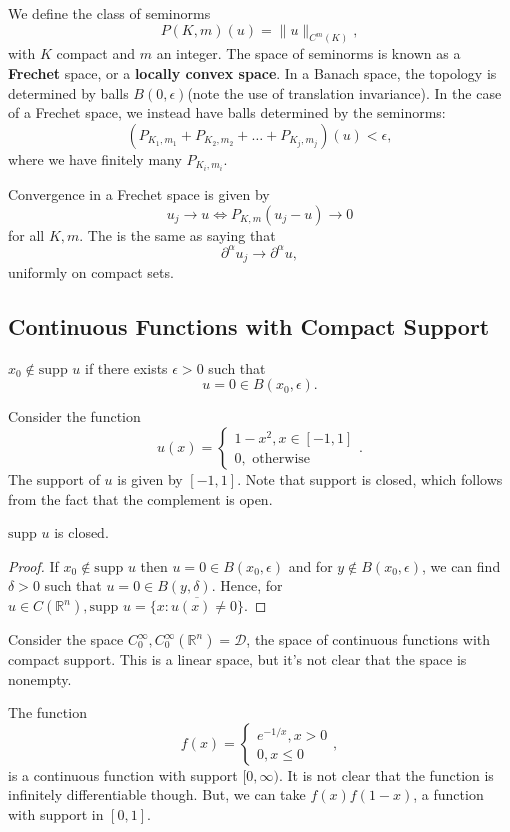 \documentclass[12pt]{scrartcl}
\newcommand{\R}{\mathbb{R}}
\newcommand{\supp}{\text{supp }}
\begin{document}
We define the class of seminorms $$P(K, m)(u) = \|u \|_{C^m(K)},$$
with $K$ compact and $m$ an integer.  The space of seminorms is known as a \textbf{Frechet }space, or a \textbf{locally convex space}.  In a Banach space, the topology is determined by balls $B(0, \epsilon)$(note the use of translation invariance). In the case of a Frechet space, we instead have balls determined by the seminorms:
$$\left (P_{K_1, m_1} + P_{K_2, m_2} + \dots + P_{K_j, m_j}\right )(u) < \epsilon,$$
where we have finitely many $P_{K_i, m_i}$.  

Convergence in a Frechet space is given by 
$$u_j \rightarrow u \Leftrightarrow P_{K, m}(u_j - u) \rightarrow 0$$
for all $K, m$.  The is the same as saying that 
$$\partial^\alpha u_j \rightarrow \partial^\alpha u,$$
uniformly on compact sets.

\subsection{Continuous Functions with Compact Support}
\begin{definition} $x_0 \not \in \text{supp }u$ if there exists $\epsilon > 0$ such that 
$$u = 0 \in B(x_0, \epsilon).$$
\end{definition}
\begin{example}
Consider the function $$u(x) = \begin{cases} 1-x^2, x \in [-1, 1] \\ 0, \text{ otherwise}
\end{cases}.$$
The support of $u$ is given by $[-1, 1]$.  Note that support is closed, which follows from the fact that the complement is open.  
\end{example}
\begin{fact} $\supp u$ is closed.
\end{fact}
\begin{proof}If $x_0 \not \in \supp u$ then $u=0 \in B(x_0, \epsilon)$ and for $y \not \in B(x_0, \epsilon)$, we can find $\delta > 0$ such that $u = 0 \in B(y, \delta)$.  Hence, for $u \in C(\R^n), \supp u = \overline{\{x: u(x )\ne 0\}}.$
\end{proof}

Consider the space $C_0^\infty, C_0^{\infty}(\R^n) = \mathcal{D}$, the space of continuous functions with compact support.  This is a linear space, but it's not clear that the space is nonempty.

\begin{example} The function $$f(x) = \begin{cases} e^{-1/x}, x > 0 \\ 0, x \le 0 \end{cases},$$
is a continuous function with support $[0, \infty)$.  It is not clear that the function is infinitely differentiable though.  But, we can take $f(x)f(1-x)$, a function with support in $[0, 1]$.

\end{example}
\end{document}
